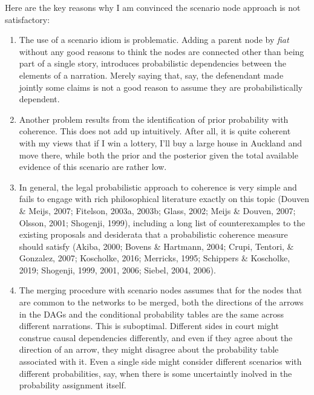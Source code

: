 \documentclass[11pt,dvipsnames,enabledeprecatedfontcommands]{scrartcl}
\begin{document}
Here are the key reasons why I am convinced the scenario node approach
is not satisfactory:

\begin{enumerate}
\def\labelenumi{\Alph{enumi}.}
\item
  The use of a scenario idiom is problematic. Adding a parent node by
  \emph{fiat} without any good reasons to think the nodes are connected
  other than being part of a single story, introduces probabilistic
  dependencies between the elements of a narration. Merely saying that,
  say, the defenendant made jointly some claims is not a good reason to
  assume they are probabilistically dependent.
\item
  Another problem results from the identification of prior probability
  with coherence. This does not add up intuitively. After all, it is
  quite coherent with my views that if I win a lottery, I'll buy a large
  house in Auckland and move there, while both the prior and the
  posterior given the total available evidence of this scenario are
  rather low.
\item
  In general, the legal probabilistic approach to coherence is very
  simple and fails to engage with rich philosophical literature exactly
  on this topic (Douven \& Meijs, 2007; Fitelson, 2003a, 2003b; Glass,
  2002; Meijs \& Douven, 2007; Olsson, 2001; Shogenji, 1999), including
  a long list of counterexamples to the existing proposals and
  desiderata that a probabilistic coherence measure should satisfy
  (Akiba, 2000; Bovens \& Hartmann, 2004; Crupi, Tentori, \& Gonzalez,
  2007; Koscholke, 2016; Merricks, 1995; Schippers \& Koscholke, 2019;
  Shogenji, 1999, 2001, 2006; Siebel, 2004, 2006).
\item
  The merging procedure with scenario nodes assumes that for the nodes
  that are common to the networks to be merged, both the directions of
  the arrows in the DAGs and the conditional probability tables are the
  same across different narrations. This is suboptimal. Different sides
  in court might construe causal dependencies differently, and even if
  they agree about the direction of an arrow, they might disagree about
  the probability table associated with it. Even a single side might
  consider different scenarios with different probabilities, say, when
  there is some uncertaintly inolved in the probability assignment
  itself.
\end{enumerate}

\vspace{2mm}
\end{document}
